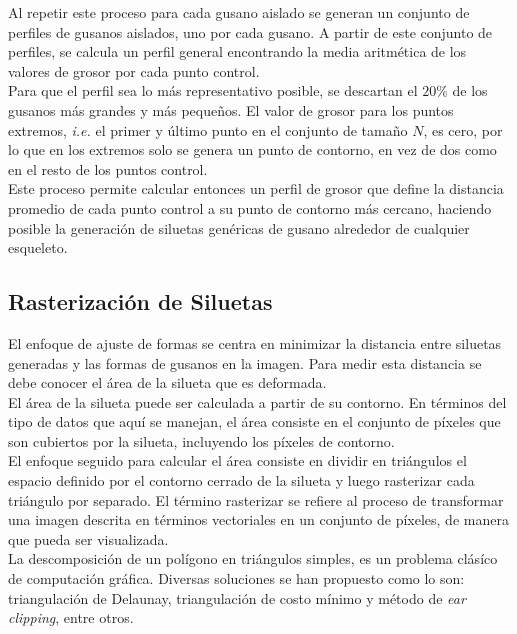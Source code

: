 Al repetir este proceso para cada gusano aislado se generan un conjunto de perfiles de gusanos
aislados, uno por cada gusano. A partir de este conjunto de perfiles, se calcula un perfil
general encontrando la media aritm\'etica de los valores de grosor por cada punto control.\\
Para que el perfil sea lo m\'as representativo posible, se descartan el $20\%$ de los gusanos
m\'as grandes y m\'as peque\~nos. El valor de grosor para los puntos extremos, \emph{i.e.} el
primer y \'ultimo punto en el conjunto de tama\~no $N$, es cero, por lo que en los extremos
solo se genera un punto de contorno, en vez de dos como en el resto de los puntos control.\\

Este proceso permite calcular entonces un perfil de grosor que define la distancia 
promedio de cada punto control a su punto de contorno m\'as cercano, haciendo posible
la generaci\'on de siluetas gen\'ericas de gusano alrededor de cualquier esqueleto.

\subsection{Rasterizaci\'on de Siluetas}
\label{sec:metrast}

El enfoque de ajuste de formas se centra en minimizar la distancia entre siluetas
generadas y las formas de gusanos en la imagen. Para medir esta distancia se debe 
conocer el \'area de la silueta que es deformada.\\
El \'area de la silueta puede ser calculada a partir de su contorno. En t\'erminos
del tipo de datos que aqu\'i se manejan, el \'area consiste en el conjunto de p\'ixeles
que son cubiertos por la silueta, incluyendo los p\'ixeles de contorno.\\

El enfoque seguido para calcular el \'area consiste en dividir
en tri\'angulos el espacio definido por el contorno cerrado de la silueta y luego
rasterizar cada tri\'angulo por separado. El t\'ermino rasterizar se
refiere al proceso de transformar una imagen descrita en t\'erminos vectoriales
en un conjunto de p\'ixeles, de manera que pueda ser visualizada.\\

La descomposici\'on de un pol\'igono en tri\'angulos simples, es un problema
cl\'as\'ico de computaci\'on gr\'afica. Diversas soluciones se han propuesto
como lo son: triangulaci\'on de Delaunay, triangulaci\'on de costo m\'inimo y
m\'etodo de \emph{ear clipping}, entre otros.
 
